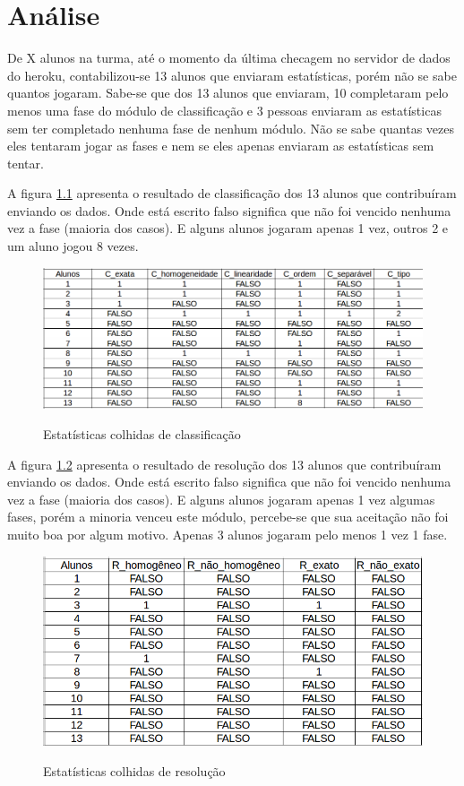 \chapter[Análise]{Análise}

De X alunos na turma, até o momento da última checagem no servidor de dados do heroku, contabilizou-se 13 alunos que enviaram estatísticas, porém não se sabe quantos jogaram. Sabe-se que dos 13 alunos que enviaram, 10 completaram pelo menos uma fase do módulo de classificação e 3 pessoas enviaram as estatísticas sem ter completado nenhuma fase de nenhum módulo. Não se sabe quantas vezes eles tentaram jogar as fases e nem se eles apenas enviaram as estatísticas sem tentar. 

A figura \ref{est_cla} apresenta o resultado de classificação dos 13 alunos que contribuíram enviando os dados. Onde está escrito falso significa que não foi vencido nenhuma vez a fase (maioria dos casos). E alguns alunos jogaram apenas 1 vez, outros 2 e um aluno jogou 8 vezes.

\begin{figure}[H]
\centering
\caption{Estatísticas colhidas de classificação}
\includegraphics[scale=0.5]{figuras/estatisticas/estatisticas_classificacao.png}
\label{est_cla}
\end{figure}


A figura \ref{est_res} apresenta o resultado de resolução dos 13 alunos que contribuíram enviando os dados. Onde está escrito falso significa que não foi vencido nenhuma vez a fase (maioria dos casos). E alguns alunos jogaram apenas 1 vez algumas fases, porém a minoria venceu este módulo, percebe-se que sua aceitação não foi muito boa por algum motivo. Apenas 3 alunos jogaram pelo menos 1 vez 1 fase.

\begin{figure}[H]
\centering
\caption{Estatísticas colhidas de resolução}
\includegraphics[scale=0.5]{figuras/estatisticas/estatisticas_resolucao.png}
\label{est_res}
\end{figure}


